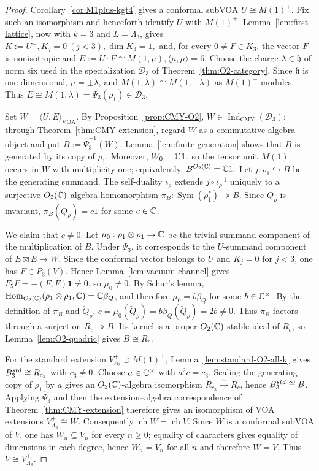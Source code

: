 \documentclass[10pt,a4paper]{amsart}
\numberwithin{equation}{section} \newtheorem{thm}{Theorem}[section] \newtheorem{lem}[thm]{Lemma} \newtheorem{ex}[thm]{Example} \newtheorem{prop}[thm]{Proposition} \newtheorem{cor}[thm]{Corollary} \newtheorem{defi}[thm]{Definition} \newtheorem{rmk}[thm]{Remark} \newtheorem{notation}[thm]{Notation}
\newcommand{\one}{\mathbf{1}}
\newcommand{\Sym}{\operatorname{Sym}}
\newcommand{\Hom}{\operatorname{Hom}}
\newcommand{\ch}{\operatorname{ch}}
\newcommand{\IndCMY}{\operatorname{Ind}_{\mathrm{CMY}}}
\newcommand{\Otwo}{O_2(\C)}
\begin{document}
\begin{proof}
Corollary~\ref{cor:M1plus-kgt4} gives a conformal subVOA \(U\cong M(1)^+.\) Fix such an isomorphism and henceforth identify $U$ with $M(1)^+$. Lemma~\ref{lem:first-lattice}, now with $k=3$ and $L=\Lambda_3$, gives \(K:=U^\perp, K_j=0\ (j<3), \dim K_3=1,\) and, for every $0\ne F\in K_3$, the vector $F$ is nonisotropic and \(E:=U\cdot F\cong M(1,\mu), \langle\mu,\mu\rangle=6.\) Choose the charge $\lambda\in\mathfrak h$ of norm six used in the specialization $\mathcal D_3$ of Theorem~\ref{thm:O2-category}. Since $\mathfrak h$ is one-dimensional, $\mu=\pm\lambda$, and $M(1,\lambda)\cong M(1,-\lambda)$ as $M(1)^+$-modules. Thus \(E\cong M(1,\lambda)=\Psi_3(\rho_1)\in\mathcal D_3.\)

Set \(W=\langle U,E\rangle_{\mathrm{VOA}}\). By Proposition~\ref{prop:CMY-O2}, $W\in\IndCMY(\mathcal D_3)$; through Theorem~\ref{thm:CMY-extension}, regard $W$ as a commutative algebra object and put \(B:=\widehat\Psi_3^{-1}(W).\) Lemma~\ref{lem:finite-generation} shows that $B$ is generated by its copy of $\rho_1$. Moreover, $W_0=\C\one$, so the tensor unit $M(1)^+$ occurs in $W$ with multiplicity one; equivalently, \(B^{\Otwo}=\C1.\) Let \(j:\rho_1\hookrightarrow B\) be the generating summand. The self-duality $\iota_\rho$ extends $j\circ\iota_\rho^{-1}$ uniquely to a surjective $\Otwo$-algebra homomorphism \(\pi_B:\Sym(\rho_1^*)\twoheadrightarrow B.\) Since $Q_\rho$ is invariant, \(\pi_B(Q_\rho)=c1\) for some $c\in\mathbb{C}$.

We claim that $c\ne0$. Let \(\mu_0:\rho_1\otimes\rho_1\to\mathbb{C}\) be the trivial-summand component of the multiplication of $B$. Under $\Psi_3$, it corresponds to the $U$-summand component of \(E\boxtimes E\to W\). Since the conformal vector belongs to $U$ and $K_j=0$ for $j<3$, one has $F\in P_3(V)$. Hence Lemma~\ref{lem:vacuum-channel} gives \(F_5F=-(F,F)\one\ne0\), so $\mu_0\ne0$. By Schur's lemma, \(\Hom_{\Otwo}(\rho_1\otimes\rho_1,\C)=\C\beta_Q\), and therefore \(\mu_0=b\beta_Q\) for some $b\in\mathbb{C}^\times$. By the definition of $\pi_B$ and $\check Q_\rho$, \(c=\mu_0(\check Q_\rho)=b \beta_Q(\check Q_\rho)=2b\ne0.\) Thus $\pi_B$ factors through a surjection \(R_c\twoheadrightarrow B\). Its kernel is a proper $\Otwo$-stable ideal of $R_c$, so Lemma~\ref{lem:O2-quadric} gives \(B\cong R_c\).

For the standard extension $V_{\Lambda_3}^+\supset M(1)^+$, Lemma~\ref{lem:standard-O2-all-k} gives \(B_3^{\rm std}\cong R_{c_3}\) with $c_3\ne0$. Choose $a\in\mathbb{C}^\times$ with $a^2c=c_3$. Scaling the generating copy of $\rho_1$ by $a$ gives an $\Otwo$-algebra isomorphism \(R_{c_3}\overset\sim\longrightarrow R_c\), hence \(B_3^{\rm std}\cong B\). Applying $\widehat\Psi_3$ and then the extension--algebra correspondence of Theorem~\ref{thm:CMY-extension} therefore gives an isomorphism of VOA extensions \(V_{\Lambda_3}^+\cong W\). Consequently \(\ch W=\ch V\). Since $W$ is a conformal subVOA of $V$, one has $W_n\subseteq V_n$ for every $n\ge0$; equality of characters gives equality of dimensions in each degree, hence $W_n=V_n$ for all $n$ and therefore $W=V$. Thus \(V\cong V_{\Lambda_3}^+\).
\end{proof}
\end{document}
